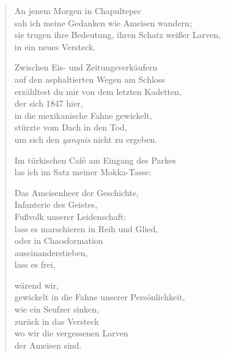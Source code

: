
\cleartoverso



\begin{verse}

An jenem Morgen in Chapultepec\\
sah ich meine Gedanken wie Ameisen wandern;\\
sie trugen ihre Bedeutung, ihren Schatz weißer Larven,\\
in ein neues Versteck.

Zwischen Eis- und Zeitungsverkäufern\\
auf den asphaltierten Wegen am Schloss\\
erzähltest du mir von dem letzten Kadetten,\\
der sich 1847 hier,\\
in die mexikanische Fahne gewickelt,\\
stürzte vom Dach in den Tod,\\
um sich den \emph{yanquis} nicht zu ergeben.

Im türkischen Café am Eingang des Parkes\\
las ich im Satz meiner Mokka-Tasse:

Das Ameisenheer der Geschichte,\\
Infanterie des Geistes,\\
Fußvolk unserer Leidenschaft:\\
lass es marschieren in Reih und Glied,\\
oder in Chaosformation\\
auseinanderstieben,\\
lass es frei,

wärend wir,\\
gewickelt in die Fahne unserer Persönlichkeit,\\
wie ein Seufzer sinken,\\
zurück in das Versteck\\
wo wir die vergessenen Larven\\
der Ameisen sind.

\end{verse}

\clearpage



